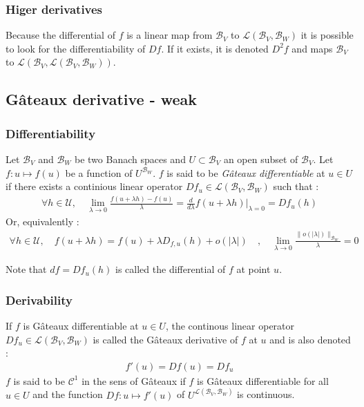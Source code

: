 \subsubsection{Higer derivatives}
 
Because the differential of $f$ is a linear map from $\mathcal{B}_V$ to $\mathcal{L}(\mathcal{B}_V,{\mathcal{B}_W})$ it is possible to look for the differentiability of $Df$. If it exists, it is denoted $D^2f$ and maps $\mathcal{B}_V$ to $\mathcal{L}(\mathcal{B}_V,\mathcal{L}(\mathcal{B}_V,{\mathcal{B}_W}))$.
 
\subsection{Gâteaux derivative - weak}
\subsubsection{Differentiability}
Let $\mathcal{B}_V$ and $\mathcal{B}_W$ be two Banach spaces and $U \subset \mathcal{B}_V$ an open subset of $\mathcal{B}_V$.
Let $f : u \longmapsto f(u)$ be a function of  $U^{\mathcal{B}_W}$.
$f$ is said to be \emph{Gâteaux differentiable} at $u\in U$ if there exists a continious linear operator $Df_{u} \in 
\mathcal{L}(\mathcal{B}_V,{\mathcal{B}_W})$ such that :
\begin{align}
\forall h \in \mathcal{U}, \quad\lim_{\lambda \to 0} \frac{f(u+\lambda h) - f(u)}{\lambda} = \frac{d}{d\lambda}f(u+\lambda h)\Bigr|_{\lambda = 0} = Df_u(h)
\end{align}
Or, equivalently :
\begin{align}
	\forall h \in \mathcal{U}, \quad f(u+\lambda h) = f(u) + \lambda D_{f,u}(h) + o(|\lambda|)
	\quad , \quad \lim_{\lambda \to 0} \frac{\|o(|\lambda|)\|_{\mathcal{B}_W}}{\lambda} = 0
\end{align}

Note that $df = Df_{u}(h)$ is called the differential of $f$ at point $u$.

\subsubsection{Derivability}
If $f$ is Gâteaux differentiable at $u \in U$, the continous linear operator $Df_{u} \in 
\mathcal{L}(\mathcal{B}_V,{\mathcal{B}_W})$ is called the Gâteaux derivative of $f$ at $u$ and is also denoted :
\begin{align}
	f'(u) = Df(u) = Df_{u}
\end{align}
$f$ is said to be $\mathcal{C}^1$ in the sens of Gâteaux if $f$ is Gâteaux differentiable for all $u \in U$ and the function $Df : u \longmapsto f'(u)$ of $U^{\mathcal{L}(\mathcal{B}_V,{\mathcal{B}_W})}$ is continuous.
 

